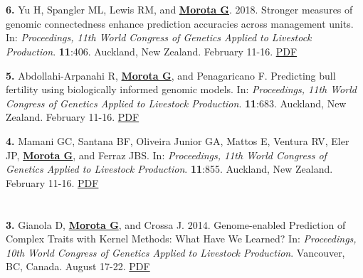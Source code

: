 \documentclass[margin,line,10pt]{res}
\newenvironment{list1}{
  \begin{list}{\ding{113}}{%
      \setlength{\itemsep}{0in}
      \setlength{\parsep}{0in} \setlength{\parskip}{0in}
      \setlength{\topsep}{0in} \setlength{\partopsep}{0in} 
      \setlength{\leftmargin}{0.17in}}}{\end{list}}
\begin{document}
\begin{resume}
\begin{list1}
\end{list1}


\section{}
\begin{list1}
  
\item [\bf{6}.] Yu H, Spangler ML, Lewis RM, and {\bf \underline{Morota G}}. 2018. 
Stronger measures of genomic connectedness enhance prediction accuracies across management units. In: \emph{Proceedings, 11th World Congress of Genetics Applied to Livestock Production}. \textbf{11}:406. Auckland, New Zealand. February 11-16.
\textcolor{blue}{\href{http://www.wcgalp.org/proceedings/2018/stronger-measures-genomic-connectedness-enhance-prediction-accuracies-across}{PDF}}

\vspace{0.5cm}

\item [\bf{5}.] Abdollahi-Arpanahi R, {\bf \underline{Morota G}}, and Penagaricano F. Predicting bull fertility using biologically informed genomic models.  In: \emph{Proceedings, 11th World Congress of Genetics Applied to Livestock Production}. \textbf{11}:683. Auckland, New Zealand. February 11-16. \textcolor{blue}{\href{http://www.wcgalp.org/proceedings/2018/predicting-bull-fertility-using-biologically-informed-genomic-models}{PDF}}

  \vspace{0.5cm}
  
\item [\bf{4}.] Mamani GC, Santana BF, Oliveira Junior GA, Mattos E, Ventura RV, Eler JP, {\bf \underline{Morota G}}, and Ferraz JBS. In: \emph{Proceedings, 11th World Congress of Genetics Applied to Livestock Production}. \textbf{11}:855. Auckland, New Zealand. February 11-16. \textcolor{blue}{\href{http://www.wcgalp.org/proceedings/2018/effect-inbreeding-productive-traits-nellore-cattle}{PDF}} 

  
\end{list1}

\section{}
\begin{list1}
\item [\bf{3}.] Gianola D, {\bf \underline{Morota G}}, and Crossa J. 2014. 
Genome-enabled Prediction of Complex Traits with Kernel Methods: What Have We Learned? In: \emph{Proceedings, 10th World Congress of Genetics Applied to Livestock Production}. Vancouver, BC, Canada. August 17-22.  
\textcolor{blue}{\href{http://www.morotalab.org/publications/pdf/gianola2014WCGALP.pdf}{PDF}}  



\end{list1}
\end{resume}
\end{document}
